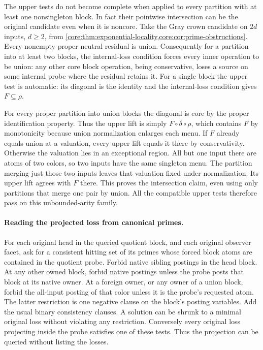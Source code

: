 The upper tests do not become complete when applied
to every partition with at least one nonsingleton
block. In fact their pointwise intersection can be
the original candidate even when it is noncore.
Take the Gray crown candidate on $2d$ inputs,
$d\ge2$, from \cref{core:thm:exponential-locality,core:cor:prime-obstructions}.
Every nonempty proper neutral residual is union.
Consequently for a partition into at least two
blocks, the internal-loss condition forces every
inner operation to be union: any other core block
operation, being conservative, loses a source on
some internal probe where the residual retains it.
For a single block the upper test is automatic:
its diagonal is the identity and the internal-loss
condition gives $F\subseteq\rho$.

For every proper partition into union blocks the
diagonal is core by the proper identification
property. Thus the upper lift is simply
$F\circ\delta\circ\rho$, which contains $F$ by
monotonicity because union normalization enlarges
each menu. If $F$ already equals union at a valuation,
every upper lift equals it there by conservativity.
Otherwise the valuation lies in an exceptional
region. All but one input there are atoms of two
colors, so two inputs have the same singleton menu.
The partition merging just those two inputs leaves
that valuation fixed under normalization. Its
upper lift agrees with $F$ there. This proves the
intersection claim, even using only partitions that
merge one pair by union. All the compatible upper tests
therefore pass on this unbounded-arity family.

\paragraph{Reading the projected loss from canonical primes.}
For each original head in the queried quotient
block, and each original observer facet, ask for
a consistent hitting set of its primes whose
forced block atoms are contained in the quotient
probe. Forbid native sibling postings in the
head block. At any other owned block, forbid
native postings unless the probe posts that
block at its native owner. At a foreign owner,
or any owner of a union block, forbid the
all-input posting of that color unless it is
the probe's requested atom. The latter
restriction is one negative clause on the
block's posting variables. Add the usual
binary consistency clauses. A solution can
be shrunk to a minimal original loss without
violating any restriction. Conversely every
original loss projecting inside the probe
satisfies one of these tests. Thus the
projection can be queried without listing
the losses.

